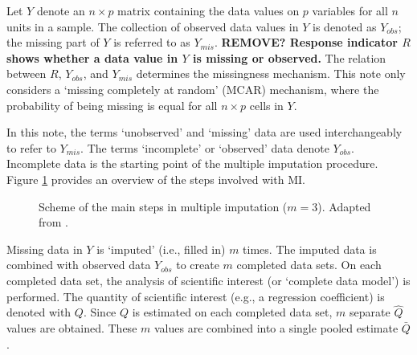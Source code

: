 \documentclass[article]{jss}
\begin{document}
Let $Y$ denote an $n \times p$ matrix containing the data values on $p$ variables for all $n$ units in a sample. The collection of observed data values in $Y$ is denoted as $Y_{obs}$; the missing part of $Y$ is referred to as $Y_{mis}$. \textbf{REMOVE? Response indicator $R$ shows whether a data value in $Y$ is missing or observed.} The relation between $R$, $Y_{obs}$, and $Y_{mis}$ determines the missingness mechanism. This note only considers a `missing completely at random' (MCAR) mechanism, where the probability of being missing is equal for all $n \times p$ cells in $Y$.

In this note, the terms `unobserved' and `missing' data are used interchangeably to refer to $Y_{mis}$. The terms `incomplete' or `observed' data denote $Y_{obs}$. Incomplete data is the starting point of the multiple imputation procedure. Figure \ref{fig:steps} provides an overview of the steps involved with MI.

\begin{figure}
\label{fig:steps}
\centering
	\large{}
\caption{Scheme of the main steps in multiple imputation ($m = 3$). Adapted from \cite[\S~1.4.1]{buur18}.}
\end{figure}

Missing data in $Y$ is `imputed' (i.e., filled in) $m$ times. The imputed data is combined with observed data $Y_{obs}$ to create $m$ completed data sets. On each completed data set, the analysis of scientific interest (or `complete data model') is performed. The quantity of scientific interest (e.g., a regression coefficient) is denoted with $Q$. Since $Q$ is estimated on each completed data set, $m$ separate $\hat{Q}$ values are obtained. These $m$ values are combined into a single pooled estimate $\bar{Q}$.
\end{document}

